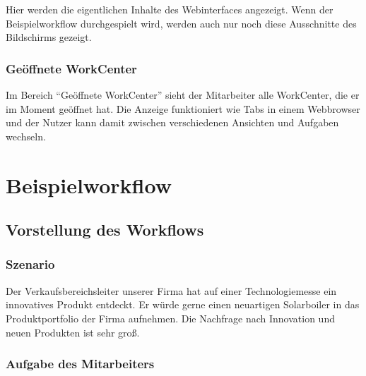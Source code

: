 Hier werden die eigentlichen Inhalte des Webinterfaces angezeigt. Wenn der Beispielworkflow durchgespielt wird, werden auch nur noch diese Ausschnitte des Bildschirms gezeigt.

\subsubsection{Geöffnete WorkCenter}

Im Bereich "`Geöffnete WorkCenter"' sieht der Mitarbeiter alle WorkCenter, die er im Moment geöffnet hat. Die Anzeige funktioniert wie Tabs in einem Webbrowser und der Nutzer kann damit zwischen verschiedenen Ansichten und Aufgaben wechseln.

\section{Beispielworkflow}

\subsection{Vorstellung des Workflows}
\label{sec:byd-bsp-vorstellung}

\subsubsection{Szenario}

Der Verkaufsbereichsleiter unserer Firma hat auf einer Technologiemesse ein innovatives Produkt entdeckt. Er würde gerne einen neuartigen Solarboiler in das Produktportfolio der Firma aufnehmen. Die Nachfrage nach Innovation und neuen Produkten ist sehr groß.

\subsubsection{Aufgabe des Mitarbeiters}


